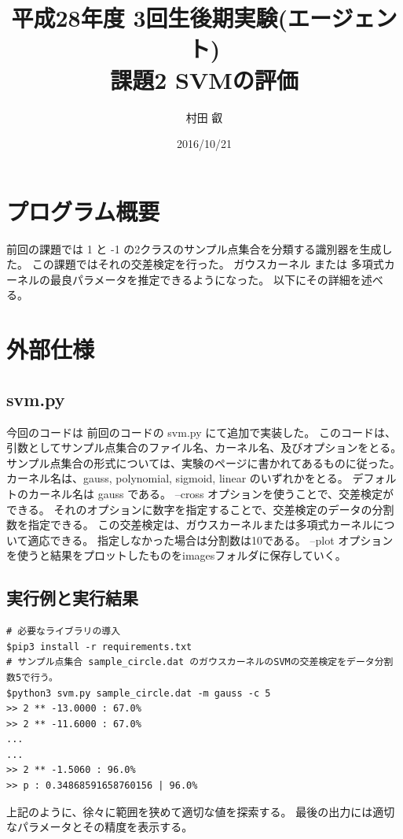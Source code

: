 \documentclass[]{jsarticle}
\begin{document}
\title{平成28年度 3回生後期実験(エージェント) \\ 課題2 SVMの評価 }
\author{村田 叡}
\date{ 2016/10/21 }
\maketitle

\section{プログラム概要}
前回の課題では 1 と -1 の2クラスのサンプル点集合を分類する識別器を生成した。
この課題ではそれの交差検定を行った。
ガウスカーネル または 多項式カーネルの最良パラメータを推定できるようになった。
以下にその詳細を述べる。

\section{外部仕様}

\subsection{svm.py}

今回のコードは 前回のコードの svm.py にて追加で実装した。
このコードは、引数としてサンプル点集合のファイル名、カーネル名、及びオプションをとる。
サンプル点集合の形式については、実験のページに書かれてあるものに従った。
カーネル名は、gauss, polynomial, sigmoid, linear のいずれかをとる。
デフォルトのカーネル名は gauss である。
--cross オプションを使うことで、交差検定ができる。
それのオプションに数字を指定することで、交差検定のデータの分割数を指定できる。
この交差検定は、ガウスカーネルまたは多項式カーネルについて適応できる。
指定しなかった場合は分割数は10である。
--plot オプションを使うと結果をプロットしたものをimagesフォルダに保存していく。


\subsection{実行例と実行結果}
\begin{verbatim}
# 必要なライブラリの導入
$pip3 install -r requirements.txt
# サンプル点集合 sample_circle.dat のガウスカーネルのSVMの交差検定をデータ分割数5で行う。
$python3 svm.py sample_circle.dat -m gauss -c 5
>> 2 ** -13.0000 : 67.0%
>> 2 ** -11.6000 : 67.0%
...
...
>> 2 ** -1.5060 : 96.0%
>> p : 0.34868591658760156 | 96.0%
\end{verbatim}
上記のように、徐々に範囲を狭めて適切な値を探索する。
最後の出力には適切なパラメータとその精度を表示する。
\end{document}
